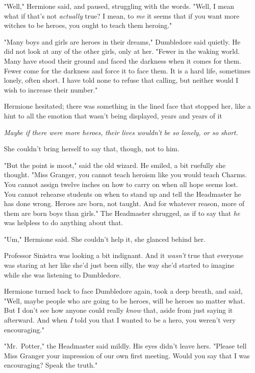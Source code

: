 "Well," Hermione said, and paused, struggling with the words. "Well, I
mean{\el} what if that's not \emph{actually} true? I mean, to \emph{me} it
seems that if you want more witches to be heroes, you ought to teach them
heroing."

"Many boys and girls are heroes in their dreams," Dumbledore said quietly. He
did not look at any of the other girls, only at her. "Fewer in the waking
world. Many have stood their ground and faced the darkness when it comes for
them. Fewer come for the darkness and force it to face them. It is a hard life,
sometimes lonely, often short. I have told none to refuse that calling, but
neither would I wish to increase their number."

Hermione hesitated; there was something in the lined face that stopped her,
like a hint to all the emotion that wasn't being displayed, years and years of
it{\el}

\emph{Maybe if there were more heroes, their lives wouldn't be so lonely, or so
short.}

She couldn't bring herself to say that, though, not to him.

"But the point is moot," said the old wizard. He smiled, a bit ruefully she
thought. "Miss Granger, you cannot teach heroism like you would teach Charms.
You cannot assign twelve inches on how to carry on when all hope seems lost.
You cannot rehearse students on when to stand up and tell the Headmaster he has
done wrong. Heroes are born, not taught. And for whatever reason, more of them
are born boys than girls." The Headmaster shrugged, as if to say that \emph{he}
was helpless to do anything about that.

"Um," Hermione said. She couldn't help it, she glanced behind her.

Professor Sinistra was looking a bit indignant. And it \emph{wasn't} true that
everyone was staring at her like she'd just been silly, the way she'd started
to imagine while she was listening to Dumbledore.

Hermione turned back to face Dumbledore again, took a deep breath, and said,
"Well, maybe people who are going to be heroes, will be heroes no matter what.
But I don't see how anyone could really \emph{know} that, aside from just
saying it afterward. And when \emph{I} told you that I wanted to be a hero, you
weren't very encouraging."

"Mr.~Potter," the Headmaster said mildly. His eyes didn't leave hers. "Please
tell Miss Granger your impression of our own first meeting. Would you say that
I was encouraging? Speak the truth."

